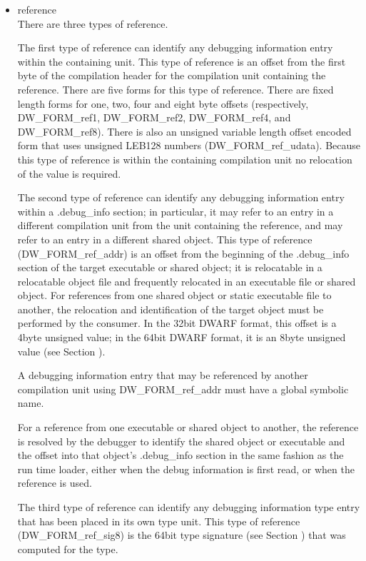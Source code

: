 \begin{itemize}
\item reference \\
There are three types of reference.

The first type of reference can identify any debugging
information entry within the containing unit. This type of
reference is an offset from the first byte of the compilation
header for the compilation unit containing the reference. There
are five forms for this type of reference. There are fixed
length forms for one, two, four and eight byte offsets
(respectively, DW\_FORM\_ref1, DW\_FORM\_ref2, DW\_FORM\_ref4,
and DW\_FORM\_ref8). There is also an unsigned variable
length offset encoded form that uses unsigned LEB128 numbers
(DW\_FORM\_ref\_udata). Because this type of reference is within
the containing compilation unit no relocation of the value
is required.

The second type of reference can identify any debugging
information entry within a .debug\_info section; in particular,
it may refer to an entry in a different compilation unit
from the unit containing the reference, and may refer to an
entry in a different shared object.  This type of reference
(DW\_FORM\_ref\_addr) is an offset from the beginning of the
.debug\_info section of the target executable or shared object;
it is relocatable in a relocatable object file and frequently
relocated in an executable file or shared object. For
references from one shared object or static executable file
to another, the relocation and identification of the target
object must be performed by the consumer. In the 32\dash bit DWARF
format, this offset is a 4\dash byte unsigned value; 
in the 64\dash bit DWARF format, it is an 8\dash byte
unsigned value 
(see Section ).

A debugging information entry that may be referenced by
another compilation unit using DW\_FORM\_ref\_addr must have a
global symbolic name.

For a reference from one executable or shared object to
another, the reference is resolved by the debugger to identify
the shared object or executable and the offset into that
object’s .debug\_info section in the same fashion as the run
time loader, either when the debug information is first read,
or when the reference is used.

The third type of reference can identify any debugging
information type entry that has been placed in its own
type unit. This type of reference (DW\_FORM\_ref\_sig8) is the
64\dash bit type signature 
(see Section ) 
that was computed
for the type.


\end{itemize}
